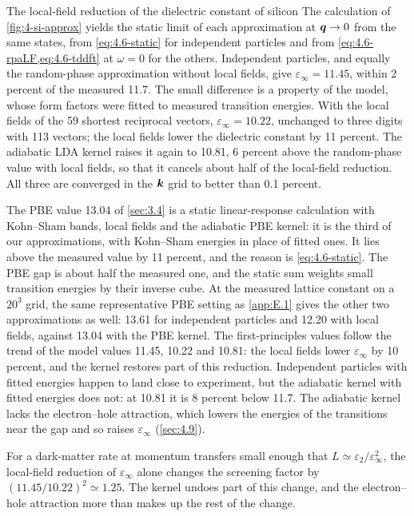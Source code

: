 \begin{workedexample}{The local-field reduction of the dielectric constant of silicon}\label{we:4-siepsinf}
The calculation of \cref{fig:4-si-approx} yields the static limit of each approximation at $\bm{q} \to 0$ from the same states, from \cref{eq:4.6-static} for independent particles and from \cref{eq:4.6-rpaLF,eq:4.6-tddft} at $\omega = 0$ for the others. Independent particles, and equally the random-phase approximation without local fields, give $\varepsilon_\infty = 11.45$, within 2 percent of the measured 11.7. The small difference is a property of the model, whose form factors were fitted to measured transition energies. With the local fields of the 59 shortest reciprocal vectors, $\varepsilon_\infty = 10.22$, unchanged to three digits with 113 vectors; the local fields lower the dielectric constant by 11 percent. The adiabatic LDA kernel raises it again to 10.81, 6 percent above the random-phase value with local fields, so that it cancels about half of the local-field reduction. All three are converged in the $\bm{k}$ grid to better than 0.1 percent.

The PBE value 13.04 of \cref{sec:3.4} is a static linear-response calculation with Kohn--Sham bands, local fields and the adiabatic PBE kernel: it is the third of our approximations, with Kohn--Sham energies in place of fitted ones. It lies above the measured value by 11 percent, and the reason is \cref{eq:4.6-static}. The PBE gap is about half the measured one, and the static sum weights small transition energies by their inverse cube. At the measured lattice constant on a $20^3$ grid, the same representative PBE setting as \cref{app:E.1} gives the other two approximations as well: 13.61 for independent particles and 12.20 with local fields, against 13.04 with the PBE kernel. The first-principles values follow the trend of the model values 11.45, 10.22 and 10.81: the local fields lower $\varepsilon_\infty$ by 10 percent, and the kernel restores part of this reduction. Independent particles with fitted energies happen to land close to experiment, but the adiabatic kernel with fitted energies does not: at 10.81 it is 8 percent below 11.7. The adiabatic kernel lacks the electron--hole attraction, which lowers the energies of the transitions near the gap and so raises $\varepsilon_\infty$ (\cref{sec:4.9}).

For a dark-matter rate at momentum transfers small enough that $L \simeq \varepsilon_2/\varepsilon_\infty^2$, the local-field reduction of $\varepsilon_\infty$ alone changes the screening factor by $(11.45/10.22)^2 \simeq 1.25$. The kernel undoes part of this change, and the electron--hole attraction more than makes up the rest of the change.
\end{workedexample}
